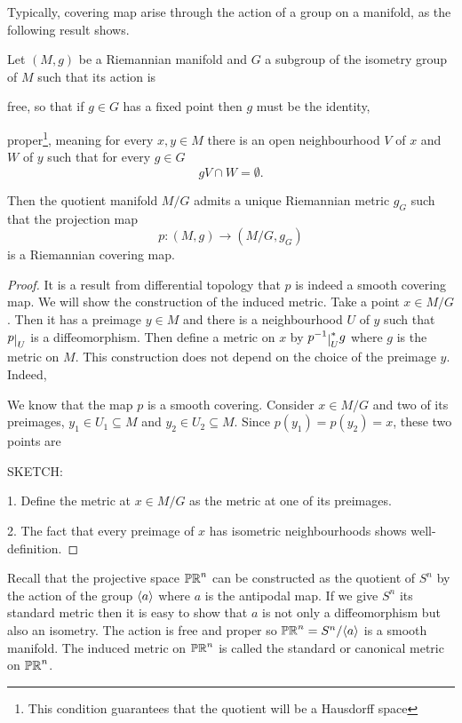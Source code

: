 \documentclass[12pt,twoside]{book}
\begin{document}
Typically, covering map arise through the action of a group on a manifold, as the following
result shows.
\begin{proposition}
	Let \( (M,g) \) be a Riemannian manifold and \( G \) a subgroup of the isometry group of
	\( M \) such that its action is 
	\begin{points}
	\item free, so that if \( g \in G \) has a fixed point then \( g \) must be the
		identity,
	\item proper\footnote{This condition guarantees that the quotient will be
		a Hausdorff space}, meaning for every \( x, y \in M \) there is an open
		neighbourhood \( V \) of \( x \) and \( W \) of \( y \) such that for every \( g \in
		G \)
		\begin{equation*}
			gV \cap W = \emptyset.  
		\end{equation*}
	\end{points}
	Then the quotient manifold \( M/G \) admits a unique Riemannian metric \( g_G \) such that
	the projection map
	\begin{equation*}
		p \colon (M,g) \to (M/G, g_G)
	\end{equation*}
	is a Riemannian covering map. 
\end{proposition}
\begin{proof}
	It is a result from differential topology that \( p \) is indeed a smooth covering map.
	We will show the construction of the induced metric. Take a point \( x \in M/G \). Then
	it has a preimage \( y \in M \) and there is a neighbourhood \( U \) of \( y \) such
	that \( p\rest{U} \) is a diffeomorphism. Then define a metric on \( x \) by \(
	p^{-1}\rest{U}^\ast g \) where \( g \) is the metric on \( M \). This construction does
	not depend on the choice of the preimage \( y \). Indeed, 


	We know that the map \( p \) is a smooth covering. Consider \( x \in M/G \) and two of
	its preimages, \( y_1 \in U_1 \subseteq M \) and \( y_2 \in U_2 \subseteq M \). Since \(
	p(y_1) = p(y_2) = x \), these two points are 

	SKETCH:
	
	1. Define the metric at \( x \in M/G \) as the metric at one of its preimages.
	 
	2. The fact that every preimage of \( x \) has isometric neighbourhoods shows
	well-definition. 
\end{proof}

\begin{example}
	Recall that the projective space \( \mathbb{PR}^n \) can be constructed as the quotient of \(
	S^n \) by the action of the group \( \langle a \rangle \) where \( a \) is the antipodal map. If
	we give \( S^n \) its standard metric then it is easy to show that \( a \) is not only a
	diffeomorphism but also an isometry. The action is free and proper so \( \mathbb{PR}^n =
	S^n/\langle a \rangle \) is a smooth manifold. The induced metric on \( \mathbb{PR}^n \) is called the
	standard or canonical metric on \( \mathbb{PR}^n \). 
\end{example}
\end{document}
